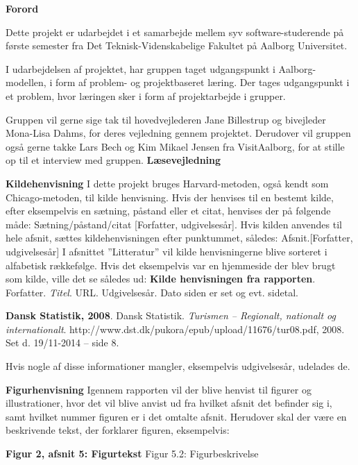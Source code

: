 {\Huge\textbf{Forord}}

Dette projekt er udarbejdet i et samarbejde mellem syv software-studerende på første semester fra Det Teknisk-Videnskabelige Fakultet på Aalborg Universitet. 

I udarbejdelsen af projektet, har gruppen taget udgangspunkt i Aalborg-modellen, i form af problem- og projektbaseret læring. Der tages udgangspunkt i et problem, hvor læringen sker i form af projektarbejde i grupper.

Gruppen vil gerne sige tak til hovedvejlederen Jane Billestrup og bivejleder Mona-Lisa Dahms, for deres vejledning gennem projektet. Derudover vil gruppen også gerne takke Lars Bech og Kim Mikael Jensen fra VisitAalborg, for at stille op til et interview med gruppen. \newline
\newline
\newline
{\Huge\textbf{Læsevejledning}}

{\Large\textbf{Kildehenvisning}}\newline
I dette projekt bruges Harvard-metoden, også kendt som Chicago-metoden, til kilde henvisning. Hvis der henvises til en bestemt kilde, efter eksempelvis en sætning, påstand eller et citat, henvises der på følgende måde: Sætning/påstand/citat [Forfatter, udgivelsesår].\newline
Hvis kilden anvendes til hele afsnit, sættes kildehenvisningen efter punktummet, således: Afsnit.[Forfatter, udgivelsesår]\newline
I afsnittet ”Litteratur” vil kilde henvisningerne blive sorteret i alfabetisk rækkefølge. Hvis det eksempelvis var en hjemmeside der blev brugt som kilde, ville det se således ud: \newline
\textbf{Kilde henvisningen fra rapporten}. Forfatter. \textit{Titel}. URL. Udgivelsesår. Dato siden er set og evt. sidetal.

\textbf{Dansk Statistik, 2008}. Dansk Statistik. \textit{Turismen – Regionalt, nationalt og internationalt}. http://www.dst.dk/pukora/epub/upload/11676/tur08.pdf, 2008. Set d. 19/11-2014 – side 8.

Hvis nogle af disse informationer mangler, eksempelvis udgivelsesår, udelades de.

{\Large\textbf{Figurhenvisning}} \newline
Igennem rapporten vil der blive henvist til figurer og illustrationer, hvor det vil blive anvist ud fra hvilket afsnit det befinder sig i, samt hvilket nummer figuren er i det omtalte afsnit. Herudover skal der være en beskrivende tekst, der forklarer figuren, eksempelvis:
\begin{flushleft}
	{\LARGE\textbf{Figur 2, afsnit 5: Figurtekst}}\newline
	Figur 5.2: Figurbeskrivelse
\end{flushleft}
